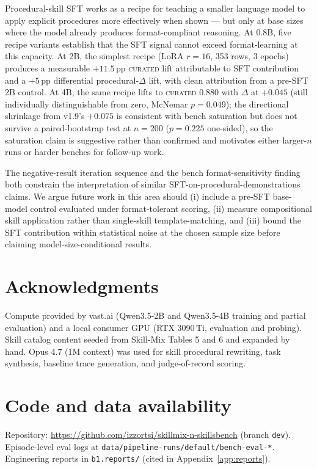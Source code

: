 \documentclass[10pt]{article}
\newcommand{\CU}{\textsc{curated}\xspace}
\newcommand{\Qwent}{Qwen3.5-2B\xspace}
\newcommand{\Qwenf}{Qwen3.5-4B\xspace}
\begin{document}
Procedural-skill SFT works as a recipe for teaching a smaller language model to apply explicit procedures more effectively when shown --- but only at base sizes where the model already produces format-compliant reasoning. At 0.8B, five recipe variants establish that the SFT signal cannot exceed format-learning at this capacity. At 2B, the simplest recipe (LoRA $r{=}16$, 353 rows, 3 epochs) produces a measurable $+11.5$\,pp \CU{} lift attributable to SFT contribution and a $+5$\,pp differential procedural-$\Delta$ lift, with clean attribution from a pre-SFT 2B control. At 4B, the same recipe lifts to \CU{} $0.880$ with $\Delta$ at $+0.045$ (still individually distinguishable from zero, McNemar $p{=}0.049$); the directional shrinkage from v1.9's $+0.075$ is consistent with bench saturation but does not survive a paired-bootstrap test at $n{=}200$ ($p{=}0.225$ one-sided), so the saturation claim is suggestive rather than confirmed and motivates either larger-$n$ runs or harder benches for follow-up work.

The negative-result iteration sequence and the bench format-sensitivity finding both constrain the interpretation of similar SFT-on-procedural-demonstrations claims. We argue future work in this area should (i) include a pre-SFT base-model control evaluated under format-tolerant scoring, (ii) measure compositional skill application rather than single-skill template-matching, and (iii) bound the SFT contribution within statistical noise at the chosen sample size before claiming model-size-conditional results.

\section*{Acknowledgments}
Compute provided by vast.ai (\Qwent{} and \Qwenf{} training and partial evaluation) and a local consumer GPU (RTX 3090\,Ti, evaluation and probing). Skill catalog content seeded from Skill-Mix \citep{yu2024skillmix} Tables 5 and 6 and expanded by hand. Opus 4.7 (1M context) was used for skill procedural rewriting, task synthesis, baseline trace generation, and judge-of-record scoring.

\section*{Code and data availability}
Repository: \url{https://github.com/izzortsi/skillmix-n-skillsbench} (branch \texttt{dev}). Episode-level eval logs at \texttt{data/pipeline-runs/default/bench-eval-*}. Engineering reports in \texttt{b1.reports/} (cited in Appendix~\ref{app:reports}).
\end{document}
